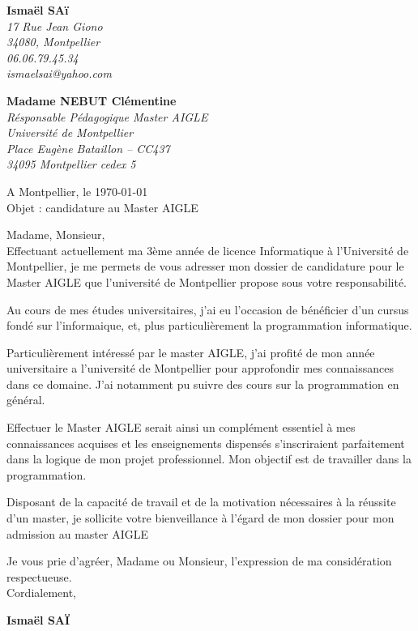 \documentclass[11pt]{letter}
\begin{document}
 \sffamily
 \hfill
 
 \begin{flushleft}
 {\bfseries Ismaël SAï}\\[.35ex]
 \small\itshape
 17 Rue Jean Giono\\
 34080, Montpellier\\[.35ex]
 06.06.79.45.34\\
 ismaelsai@yahoo.com
 \end{flushleft}
 
 \begin{flushright}
 {\bfseries Madame NEBUT Clémentine}\\[.35ex]
 \small\itshape
 Résponsable Pédagogique Master AIGLE\\
 Université de Montpellier\\
 Place Eugène Bataillon – CC437\\
 34095 Montpellier cedex 5
 \end{flushright}
 
 \hfill
 
 \begin{flushright}
 A Montpellier, le \today \\
 Objet : candidature au Master AIGLE
 \end{flushright}
 
 Madame, Monsieur,\\
Effectuant actuellement ma 3ème année de licence Informatique à l’Université de Montpellier, je me permets de vous adresser mon dossier de candidature pour le Master AIGLE que l’université de Montpellier propose sous votre responsabilité.

Au cours de mes études universitaires, j’ai eu l’occasion de bénéficier d’un cursus fondé sur l'informaique, et, plus particulièrement la programmation informatique.

Particulièrement intéressé par le master AIGLE, j’ai profité de mon année universitaire a l'université de Montpellier pour approfondir mes connaissances dans ce domaine. J’ai notamment pu suivre des cours sur la programmation en général.

Effectuer le Master AIGLE serait ainsi un complément essentiel à mes connaissances acquises et les enseignements dispensés s’inscriraient parfaitement dans la logique de mon projet professionnel. Mon objectif est de travailler dans la programmation.

Disposant de la capacité de travail et de la motivation nécessaires à la réussite d’un master, je sollicite votre bienveillance à l’égard de mon dossier pour mon admission au master AIGLE

Je vous prie d’agréer, Madame ou Monsieur, l’expression de ma considération respectueuse.\\
Cordialement,\\
 \begin{center}
 {\bfseries Ismaël SAÏ}\\
 \end{center}
 \vfill
 
\end{document}
